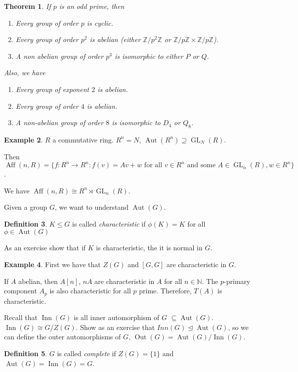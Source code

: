 \documentclass{amsart}
\newtheorem{thm}{Theorem}[section]
\theoremstyle{definition}
\newtheorem{definition}[thm]{Definition}
\newtheorem{example}[thm]{Example}
\newcommand{\N}{\mathbb N}
\newcommand{\Z}{\mathbb Z}
\DeclareMathOperator{\GL}{GL}
\DeclareMathOperator{\Aut}{Aut}
\DeclareMathOperator{\Inn}{Inn}
\DeclareMathOperator{\Out}{Out}
\DeclareMathOperator{\Aff}{Aff}
\begin{document}
 \begin{thm}
 	If $p$ is an odd prime, then
 	\begin{enumerate}
 		\item Every group of order $p$ is cyclic.
 		\item Every group of order $p^2$ is abelian (either $\Z/p^2\Z$ or $\Z/p\Z\times \Z/p\Z$).
 		\item A non abelian group of order $p^3$ is isomorphic to either $P$ or $Q$.
 	\end{enumerate}
 	
 	Also, we have
 	\begin{enumerate}
 		\item Every group of exponent $2$ is abelian.
 		\item Every group of order $4$ is abelian.
 		\item A non-abelian group of order $8$ is isomorphic to $D_4$ or $Q_8$.
 	\end{enumerate}
 \end{thm}
 \begin{example}
 	$R$ a commutative ring. $R^n=N$, $\Aut(R^n)\supseteq \GL_N(R)$.
 	
 	Then $\Aff(n,R)=\{f:R^n\to R^n:f(v)=Av+w\text{ for all $v\in R^n$ and some $A\in\GL_n(R), w\in R^n$}\}$.
 	
 	We have $\Aff(n,R)\cong R^n\rtimes \GL_n(R)$.
 \end{example}
Given a group $G$, we want to understand $\Aut(G)$.
\begin{definition}
	$K\leq G$ is called \emph{characteristic} if $\phi(K)=K$ for all $\phi\in\Aut(G)$
\end{definition}
As an exercise show that if $K$ is characteristic, the it is normal in $G$.
\begin{example}
	First we have that $Z(G)$ and $[G,G]$ are characteristic in $G$.
	
	If $A$ abelian, then $A[n]$, $nA$ are characteristic in $A$ for all $n\in \N$. The $p$-primary component $A_p$ is also characteristic for all $p$ prime. Therefore, $T(A)$ is characteristic.
\end{example}
Recall that $\Inn(G)$ is all inner automorphism of $G$ $\subseteq \Aut(G)$. $\Inn(G)\cong G/Z(G)$.
Show as an exercise that $Inn(G)\unlhd \Aut(G)$, so we can define the outer automorphisms of $G$, $\Out(G)=\Aut(G)/\Inn(G)$.
\begin{definition}
	$G$ is called \emph{complete} if $Z(G)=\{1\}$ and $\Aut(G)=\Inn(G)=G$.
\end{definition}
\end{document}
